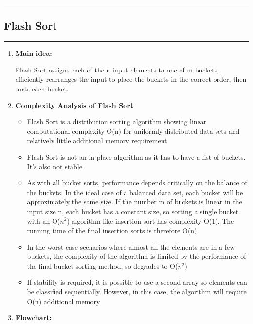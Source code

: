\documentclass[11pt,a4paper]{article}
\begin{document}
{		\rule{15cm}{0.1cm}
		\subsection{Flash Sort}
		\rule{15cm}{0.1cm}
			\begin{enumerate}[label=\textbf{\arabic*})]
				\item \textbf{Main idea:}
				
					Flash Sort assigns each of the n input elements to one of m buckets, efficiently rearranges the input to place the buckets in the correct order, then sorts each bucket.
				\\[12pt]
				\item \textbf{Complexity Analysis of Flash Sort}
				\begin{itemize}
				\item Flash Sort is a distribution sorting algorithm showing linear computational complexity O(n) for uniformly distributed data sets and relatively little additional memory requirement
                \item Flash Sort is not an in-place algorithm as it has to have a list of buckets. It’s also not stable
                \item As with all bucket sorts, performance depends critically on the balance of the buckets. In the ideal case of a balanced data set, each bucket will be approximately the same size. If the number m of buckets is linear in the input size n, each bucket has a constant size, so sorting a single bucket with an O($n^2$) algorithm like insertion sort has complexity O(1). The running time of the final insertion sorts is therefore O(n)
                \item In the worst-case scenarios where almost all the elements are in a few buckets, the complexity of the algorithm is limited by the performance of the final bucket-sorting method, so degrades to O($n^2$)
                \item If stability is required, it is possible to use a second array so elements can be classified sequentially. However, in this case, the algorithm will require O(n) additional memory
                \end{itemize}
				\item \textbf{Flowchart:}
					\begin{figure}[H]
						\centering 

\end{figure}
\end{enumerate}}
\end{document}

